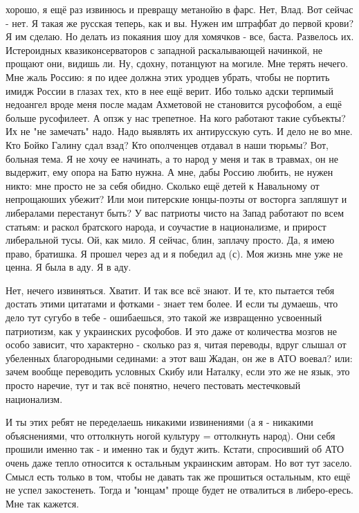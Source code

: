 \begin{itemize}
\begin{itemize}
хорошо, я ещё раз извинюсь и превращу метанойю в фарс. Нет, Влад. Вот сейчас -
нет. Я такая же русская теперь, как и вы. Нужен им штрафбат до первой крови? Я
им сделаю. Но делать из покаяния шоу для хомячков - все, баста. Развелось их.
Истероидных квазиконсерваторов с западной раскалывающей начинкой, не прощают
они, видишь ли. Ну, сдохну, потанцуют на могиле. Мне терять нечего. Мне жаль
Россию: я по идее должна этих уродцев убрать, чтобы не портить имидж России в
глазах тех, кто в нее ещё верит. Ибо только адски терпимый недоангел вроде меня
после мадам Ахметовой не становится русофобом, а ещё больше русофилеет. А опзж
у нас трепетное. На кого работают такие субъекты? Их не "не замечать" надо.
Надо выявлять их антирусскую суть. И дело не во мне. Кто Бойко Галину сдал
взад? Кто ополченцев отдавал в наши тюрьмы? Вот, больная тема. Я не хочу ее
начинать, а то народ у меня и так в травмах, он не выдержит, ему опора на Батю
нужна. А мне, дабы Россию любить, не нужен никто: мне просто не за себя обидно.
Сколько ещё детей к Навальному от непрощаюших убежит? Или мои питерские
юнцы-поэты от восторга запляшут и либералами перестанут быть? У вас патриоты
чисто на Запад работают по всем статьям: и раскол братского народа, и соучастие
в национализме, и прирост либеральной тусы. Ой, как мило. Я сейчас, блин,
заплачу просто. Да, я имею право, братишка. Я прошел через ад и я победил ад
(с). Моя жизнь мне уже не ценна. Я была в аду. Я в аду.


Нет, нечего извиняться. Хватит. И так все всё знают. И те, кто пытается тебя
достать этими цитатами и фотками - знает тем более. И если ты думаешь, что дело
тут сугубо в тебе - ошибаешься, это такой же извращенно усвоенный патриотизм,
как у украинских русофобов. И это даже от количества мозгов не особо зависит,
что характерно - сколько раз я, читая переводы, вдруг слышал от убеленных
благородными сединами: а этот ваш Жадан, он же в АТО воевал? или: зачем вообще
переводить условных Скибу или Наталку, если это же не язык, это просто наречие,
тут и так всё понятно, нечего пестовать местечковый национализм.

И ты этих ребят не переделаешь никакими извинениями (а я - никакими
объяснениями, что оттолкнуть ногой культуру = оттолкнуть народ). Они себя
прошили именно так - и именно так и будут жить. Кстати, спросивший об АТО очень
даже тепло относится к остальным украинским авторам. Но вот тут засело. Смысл
есть только в том, чтобы не давать так же прошиться остальным, кто ещё не успел
закостенеть. Тогда и "юнцам" проще будет не отвалиться в либеро-ересь. Мне так
кажется.
\end{itemize}


\end{itemize}
